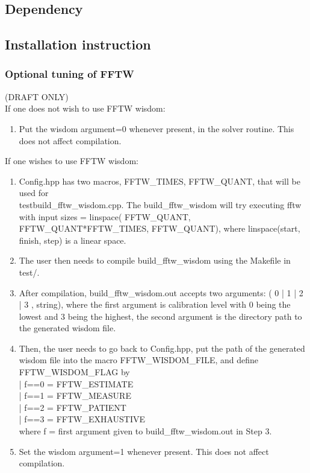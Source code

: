 \documentclass[english,11pt]{article}
\begin{document}
\subsection{Dependency}
\subsection{Installation instruction}
	\subsubsection{Optional tuning of FFTW}
		(DRAFT ONLY)\\
		If one does not wish to use FFTW wisdom:
		\begin{enumerate}
			\item Put the wisdom argument=0 whenever present, in the solver routine. This does not affect compilation. 
		\end{enumerate}
If one wishes to use FFTW wisdom:
\begin{enumerate}
		\item Config.hpp has two macros, FFTW\_TIMES, FFTW\_QUANT, that will be used for \\ test\/build\_fftw\_wisdom.cpp. The build\_fftw\_wisdom will try executing fftw with input sizes = linspace( FFTW\_QUANT, FFTW\_QUANT*FFTW\_TIMES, FFTW\_QUANT), where linspace(start, finish, step) is a linear space.
	\item The user then needs to compile build_fftw_wisdom using the Makefile in test/. 
	\item After compilation, build_fftw_wisdom.out accepts two arguments: ( 0 | 1 | 2 | 3 , string), where the first argument is calibration level with 0 being the lowest and 3 being the highest, the second argument is the directory path to the generated wisdom file. 
	\item Then, the user needs to go back to Config.hpp, put the path of the generated wisdom file into the macro FFTW_WISDOM_FILE, and define FFTW_WISDOM_FLAG by \\
	 | f==0	= FFTW_ESTIMATE \\
	 | f==1	= FFTW_MEASURE \\
	 | f==2	= FFTW_PATIENT \\
	 | f==3 	= FFTW_EXHAUSTIVE \\
		where f = first argument given to build_fftw_wisdom.out in Step 3. 
	
	\item Set the wisdom argument=1 whenever present. This does not affect compilation.
	\end{enumerate}
\end{document}
